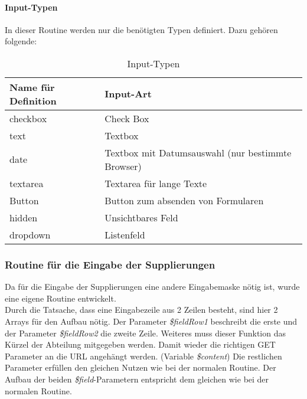\paragraph{Input-Typen\\} \label{sec:content_imple_input_type}
In dieser Routine werden nur die benötigten Typen definiert. Dazu gehören folgende:
\begin{table}[H]
\centering
\begin{tabular}{p{4.5 cm}p{10.5 cm}}
   \toprule
   \textbf{Name für Definition} & \textbf{Input-Art} \\
   \midrule
          checkbox & Check Box  \\
          \hline
          text & Textbox \\
          \hline
          date & Textbox mit Datumsauswahl (nur bestimmte Browser) \\
          \hline
          textarea & Textarea für lange Texte\\
          \hline
          Button & Button zum absenden von Formularen\\
          \hline
          hidden & Unsichtbares Feld \\
          \hline
          dropdown & Listenfeld \\
   \bottomrule
\end{tabular}
\caption{Input-Typen}
\end{table}
\subsubsection{Routine für die Eingabe der Supplierungen}
Da für die Eingabe der Supplierungen eine andere Eingabemaske nötig ist, wurde eine eigene Routine entwickelt.\\
Durch die Tatsache, dass eine Eingabezeile aus 2 Zeilen besteht, sind hier 2 Arrays für den Aufbau nötig. Der Parameter \textit{\$fieldRow1} beschreibt die erste und der Parameter \textit{\$fieldRow2} die zweite Zeile. Weiteres muss dieser Funktion das Kürzel der Abteilung mitgegeben werden. Damit wieder die richtigen GET Parameter an die URL angehängt werden. (Variable \textit{\$content}) Die restlichen Parameter erfüllen den gleichen Nutzen wie bei der normalen Routine. Der Aufbau der beiden \textit{\$field}-Parametern entspricht dem gleichen wie bei der normalen Routine.\\
